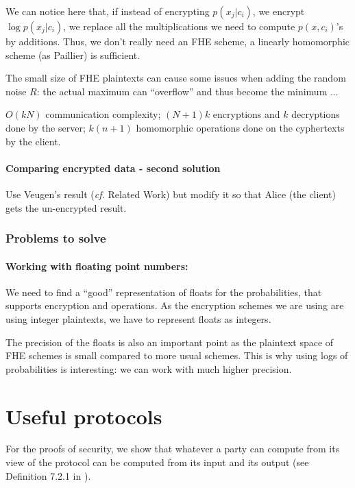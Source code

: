 \documentclass[11pt]{article}
\begin{document}
	We can notice here that, if instead of encrypting $p(x_j|c_i)$, we encrypt $\log p(x_j|c_i)$, we replace all the multiplications we need to compute $p(x,c_i)$'s by additions. Thus, we don't really need an FHE scheme, a linearly homomorphic scheme (as Paillier) is sufficient. 
	
	The small size of FHE plaintexts can cause some issues when adding the random noise $R$: the actual maximum can ``overflow'' and thus become the minimum ...
	
	$O(kN)$ communication complexity; $(N+1)k$ encryptions and $k$ decryptions done by the server; $k(n+1)$ homomorphic operations done on the cyphertexts by the client.
	   
	\paragraph{Comparing encrypted data - second solution}
	Use Veugen's result (\emph{cf.} Related Work) but modify it so that Alice (the client) gets the un-encrypted result. 
	  
          
\subsubsection{Problems to solve} %
\label{ssub:problems_bayes}
\paragraph{Working with floating point numbers:} We need to find a ``good'' representation of floats for the probabilities, that supports encryption and operations. As the encryption schemes we are using are using integer plaintexts, we have to represent floats as integers. 

The precision of the floats is also an important point as the plaintext space of FHE schemes is small compared to more usual schemes. This is why using logs of probabilities is interesting: we can work with much higher precision. 

        
\section{Useful protocols} %
\label{sec:useful_protocols}

For the proofs of security, we show that whatever a party can compute from its view of the protocol can be computed from its input and its output (see Definition 7.2.1 in \cite{Goldreich2}).                                
\end{document}
